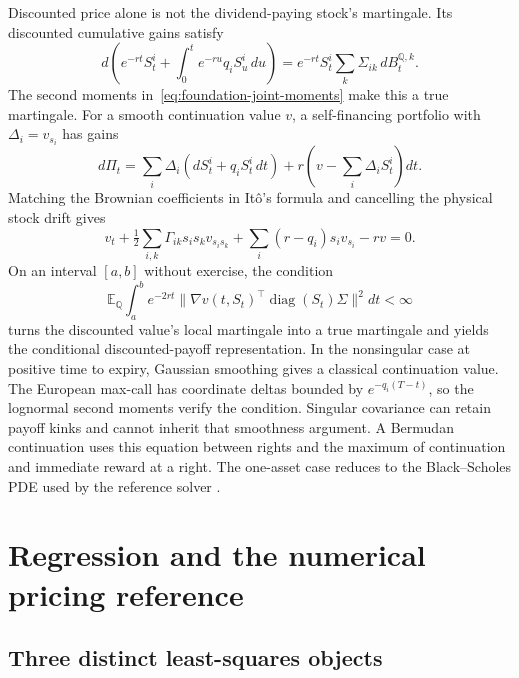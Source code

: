 \documentclass[11pt]{article}
\newcommand{\E}{\mathbb E}
\newcommand{\Q}{\mathbb Q}
\begin{document}
Discounted price alone is not the dividend-paying stock's martingale. Its discounted cumulative gains satisfy
\begin{equation}
 d\!\left(e^{-rt}S_t^i+
             \int_0^t e^{-ru}q_iS_u^i\,du\right)
 =e^{-rt}S_t^i\sum_k\Sigma_{ik}\,dB_t^{\Q,k}.
\label{eq:foundation-discounted-gains}
\end{equation}
The second moments in~\eqref{eq:foundation-joint-moments} make this a true martingale. For a smooth continuation value $v$, a self-financing portfolio with $\Delta_i=v_{s_i}$ has gains
\begin{equation}
 d\Pi_t=\sum_i\Delta_i(dS_t^i+q_iS_t^i\,dt)
       +r\left(v-\sum_i\Delta_iS_t^i\right)dt.
\end{equation}
Matching the Brownian coefficients in It\^o's formula and cancelling the physical stock drift gives
\begin{equation}
 v_t+\tfrac12\sum_{i,k}\Gamma_{ik}s_is_kv_{s_is_k}
       +\sum_i(r-q_i)s_iv_{s_i}-rv=0.
\label{eq:foundation-pde}
\end{equation}
On an interval $[a,b]$ without exercise, the condition
\begin{equation}
 \E_\Q\int_a^b e^{-2rt}\|\nabla v(t,S_t)^\top\operatorname{diag}(S_t)\Sigma\|^2dt<\infty
\label{eq:foundation-stochastic-integrability}
\end{equation}
turns the discounted value's local martingale into a true martingale and yields the conditional discounted-payoff representation. In the nonsingular case at positive time to expiry, Gaussian smoothing gives a classical continuation value. The European max-call has coordinate deltas bounded by $e^{-q_i(T-t)}$, so the lognormal second moments verify the condition. Singular covariance can retain payoff kinks and cannot inherit that smoothness argument. A Bermudan continuation uses this equation between rights and the maximum of continuation and immediate reward at a right. The one-asset case reduces to the Black--Scholes PDE used by the reference solver \citep{black1973,shreve2004}.

\section{Regression and the numerical pricing reference}
\label{app:foundations-numerics}

\subsection{Three distinct least-squares objects}
\end{document}
